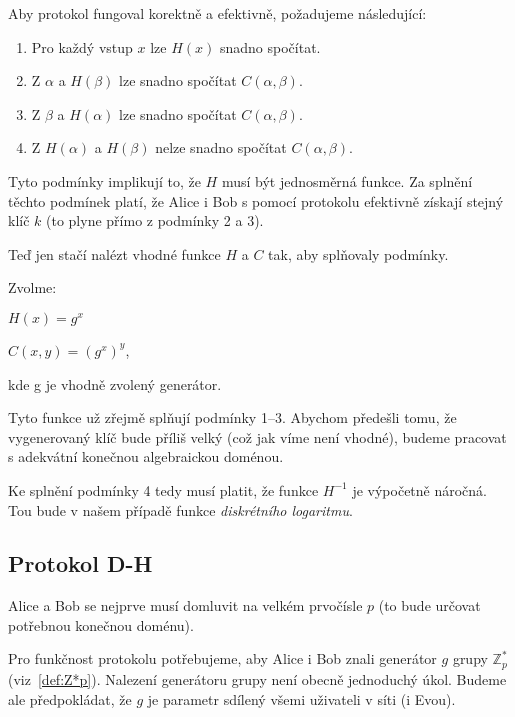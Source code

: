 \documentclass[
  program=infoi,
  biblatex,
  figures=false,
  glossaries,
  index
]{kidiplom}
\begin{document}
    Aby protokol fungoval korektně a efektivně, požadujeme následující:

    \begin{enumerate}
        \item
            Pro každý vstup $x$ lze $H(x)$ snadno spočítat.
        \item
            Z $\alpha$ a $H(\beta)$ lze snadno spočítat $C(\alpha,\beta)$.
        \item
            Z $\beta$ a $H(\alpha)$ lze snadno spočítat $C(\alpha,\beta)$.
        \item
            Z $H(\alpha)$ a $H(\beta)$ nelze snadno spočítat $C(\alpha,\beta)$.
    \end{enumerate}

    Tyto podmínky implikují to, že $H$ musí být jednosměrná funkce.
    Za splnění těchto podmínek platí, že Alice i Bob s pomocí protokolu efektivně získají
    stejný klíč $k$ (to plyne přímo z podmínky 2 a 3).

    \medskip

    Teď jen stačí nalézt vhodné funkce $H$ a $C$ tak, aby splňovaly podmínky.

    \medskip

    Zvolme:

    \begin{center}
        $H(x) = g^x$

        $C(x, y) = (g^x)^y$,

        \medskip
        kde g je vhodně zvolený generátor.
    \end{center}

    Tyto funkce už zřejmě splňují podmínky 1--3. Abychom předešli tomu, že vygenerovaný klíč bude příliš velký
    (což jak víme není vhodné), budeme pracovat s adekvátní konečnou algebraickou doménou.

    Ke splnění podmínky 4 tedy musí platit, že funkce $H^{-1}$ je výpočetně náročná.
    Tou bude v našem případě funkce \emph{diskrétního logaritmu}.


    \subsection{Protokol D-H}

        Alice a Bob se nejprve musí domluvit na velkém prvočísle $p$ (to bude určovat potřebnou konečnou doménu).

        Pro funkčnost protokolu potřebujeme, aby Alice i Bob znali generátor $g$ grupy $\mathbb{Z}^*_p$ (viz~\ref{def:Z*p}).
        Nalezení generátoru grupy není obecně jednoduchý úkol.
        Budeme ale předpokládat, že $g$ je parametr sdílený všemi uživateli v síti (i Evou).
\end{document}
